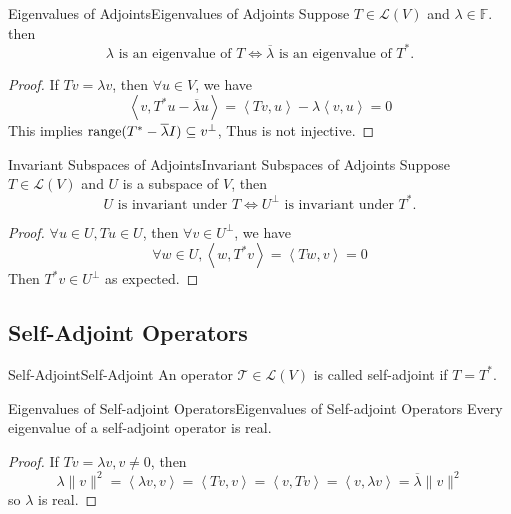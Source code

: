 \documentclass[../main.tex]{subfiles}
\begin{document}
\begin{proposition}{Eigenvalues of Adjoints}{Eigenvalues of Adjoints}
Suppose $T\in \mathscr{L}(V)$ and $\lambda\in \mathbb{F}$. then
\begin{equation*}
\lambda \text{ is an eigenvalue of }T \Longleftrightarrow \overline{\lambda} \text{ is an eigenvalue of }T^*.
\end{equation*}
\end{proposition}
\begin{proof}
If $Tv=\lambda v$, then $\forall u\in V$, we have
\begin{equation*}
\left<v,T^*u-\overline{\lambda}u\right> = \left<Tv,u\right> - \lambda\left<v,u\right> = 0
\end{equation*}
This implies $\operatorname{range} (T^* -\overline{\lambda} I) \subseteq v^{\perp}$, Thus is not injective.
\end{proof}

\begin{proposition}{Invariant Subspaces of Adjoints}{Invariant Subspaces of Adjoints}
Suppose $T\in \mathscr{L}(V)$ and $U$ is a subspace of $V$, then
\begin{equation*}
U \text{ is invariant under }T \Leftrightarrow U^{\perp} \text{ is invariant under  } T^*.
\end{equation*}
\end{proposition}
\begin{proof}
$\forall u\in U, Tu\in U$, then $\forall v\in U^{\perp}$, we have
\begin{equation*}
\forall w\in U, \left<w,T^*v\right> = \left<Tw,v\right> =0
\end{equation*}
Then $T^*v\in U^{\perp}$ as expected.
\end{proof}

\subsection{Self-Adjoint Operators}
\begin{definition}{Self-Adjoint}{Self-Adjoint}
An operator $\mathcal{T}\in \mathscr{L}(V)$ is called self-adjoint if $T=T^*$.
\end{definition}

\begin{theorem}{Eigenvalues of Self-adjoint Operators}{Eigenvalues of Self-adjoint Operators}
Every eigenvalue of a self-adjoint operator is real.
\end{theorem}
\begin{proof}
If $Tv=\lambda v,v\neq 0$, then
\begin{equation*}
\lambda \|v\|^2 = \left<\lambda v,v\right> = \left<Tv,v\right> = \left<v,Tv\right>  = \left<v,\lambda v\right> = \overline{\lambda}\|v\|^2
\end{equation*}
so $\lambda$ is real.
\end{proof}
\end{document}
